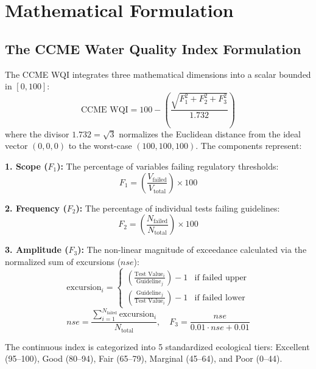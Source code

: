 \documentclass[conference]{IEEEtran}
\begin{document}
\section{Mathematical Formulation}

\subsection{The CCME Water Quality Index Formulation}
The CCME WQI integrates three mathematical dimensions into a scalar bounded in $[0, 100]$:
\begin{equation}
\text{CCME WQI} = 100 - \left( \frac{\sqrt{F_1^2 + F_2^2 + F_3^2}}{1.732} \right)
\label{eq:ccme}
\end{equation}
where the divisor $1.732 = \sqrt{3}$ normalizes the Euclidean distance from the ideal vector $(0,0,0)$ to the worst-case $(100,100,100)$. The components represent:

\textbf{1. Scope ($F_1$):} The percentage of variables failing regulatory thresholds:
\begin{equation}
F_1 = \left( \frac{V_{\text{failed}}}{V_{\text{total}}} \right) \times 100
\end{equation}

\textbf{2. Frequency ($F_2$):} The percentage of individual tests failing guidelines:
\begin{equation}
F_2 = \left( \frac{N_{\text{failed}}}{N_{\text{total}}} \right) \times 100
\end{equation}

\textbf{3. Amplitude ($F_3$):} The non-linear magnitude of exceedance calculated via the normalized sum of excursions ($nse$):
\begin{equation}
\text{excursion}_i = \begin{cases} 
\left( \frac{\text{Test Value}_i}{\text{Guideline}_j} \right) - 1 & \text{if failed upper} \\
\left( \frac{\text{Guideline}_j}{\text{Test Value}_i} \right) - 1 & \text{if failed lower}
\end{cases}
\end{equation}
\begin{equation}
nse = \frac{\sum_{i=1}^{N_{\text{failed}}} \text{excursion}_i}{N_{\text{total}}}, \quad F_3 = \frac{nse}{0.01 \cdot nse + 0.01}
\end{equation}

The continuous index is categorized into 5 standardized ecological tiers: Excellent (95--100), Good (80--94), Fair (65--79), Marginal (45--64), and Poor (0--44).
\end{document}
